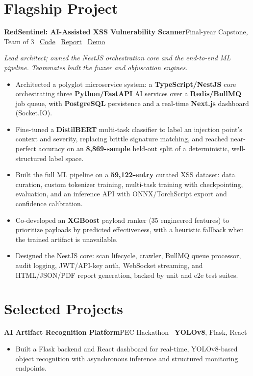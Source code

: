 \documentclass[a4paper,10pt]{article}
\newcommand{\project}[2]{\textbf{#1}\hfill{\color{rulegray}\small #2}\par\vspace{1pt}}
\begin{document}
\section*{Flagship Project}

\project{RedSentinel: AI-Assisted XSS Vulnerability Scanner}{Final-year Capstone, Team of 3 \textbar\ \href{https://github.com/seamoonpandey/Xbow}{Code} \textbar\ \href{https://github.com/seamoonpandey/Xbow-report}{Report} \textbar\ \href{https://drive.google.com/file/d/1HZmdURP3l8JNoTyL40me_O1-8kat4Q9d/view?usp=sharing}{Demo}}
\textit{Lead architect; owned the NestJS orchestration core and the end-to-end ML pipeline. Teammates built the fuzzer and obfuscation engines.}
\begin{itemize}
\item Architected a polyglot microservice system: a \textbf{TypeScript/NestJS} core orchestrating three \textbf{Python/FastAPI} AI services over a \textbf{Redis/BullMQ} job queue, with \textbf{PostgreSQL} persistence and a real-time \textbf{Next.js} dashboard (Socket.IO).
\item Fine-tuned a \textbf{DistilBERT} multi-task classifier to label an injection point's context and severity, replacing brittle signature matching, and reached near-perfect accuracy on an \textbf{8,869-sample} held-out split of a deterministic, well-structured label space.
\item Built the full ML pipeline on a \textbf{59,122-entry} curated XSS dataset: data curation, custom tokenizer training, multi-task training with checkpointing, evaluation, and an inference API with ONNX/TorchScript export and confidence calibration.
\item Co-developed an \textbf{XGBoost} payload ranker (35 engineered features) to prioritize payloads by predicted effectiveness, with a heuristic fallback when the trained artifact is unavailable.
\item Designed the NestJS core: scan lifecycle, crawler, BullMQ queue processor, audit logging, JWT/API-key auth, WebSocket streaming, and HTML/JSON/PDF report generation, backed by unit and e2e test suites.
\end{itemize}

\section*{Selected Projects}

\project{AI Artifact Recognition Platform}{PEC Hackathon \textbar\ \textbf{YOLOv8}, Flask, React}
\begin{itemize}
\item Built a Flask backend and React dashboard for real-time, YOLOv8-based object recognition with asynchronous inference and structured monitoring endpoints.
\end{itemize}
\end{document}
